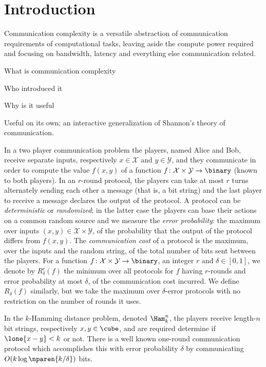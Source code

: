 \chapter{Introduction}
\label{sec:introduction}

Communication complexity is a versatile abstraction of communication requirements of computational tasks, leaving aside the compute power required and focusing on bandwidth, latency and everything else communication related.


What is communication complexity

Who introduced it

Why is it useful

Useful on its own; an interactive generalization of Shannon's theory of communication.



In a two player communication problem the players, 
named Alice and Bob, receive separate inputs, 
respectively $x\in \mathcal{X}$ and $y\in \mathcal{Y}$, 
and they communicate in order to compute the value 
$f(x,y)$ of a function
$f\colon \mathcal{X}\times \mathcal{Y}\to\binary$ 
(known to both players). 
In an $r$-round protocol, the players can take at most 
$r$ turns alternately sending each other a message 
(that is, a bit string) and the last player to receive 
a message declares the output of the protocol.
A protocol can be {\em deterministic} or {\em randomized}; 
in the latter case the players can base their actions on 
a common random source and we measure the 
{\em error probability}: the maximum over inputs 
$(x,y)\in \mathcal{X}\times\mathcal{Y}$, of the probability 
that the output of the protocol differs from $f(x,y)$. 
The {\em communication cost} of a protocol is the maximum, 
over the inputs and the random string, of the total number 
of bits sent between the players.
For a function 
$f\colon \mathcal{X}\times\mathcal{Y}\to\binary$, 
an integer $r$ and $\delta\in[0,1]$, we denote by 
$R^r_{\delta}(f)$ the minimum over all protocols
for $f$ having $r$-rounds and error probability at most 
$\delta$, of the communication cost incurred. We define 
$R_{\delta}(f)$ similarly, but we take the maximum over 
$\delta$-error protocols with no restriction on the number 
of rounds it uses.

In the $k$-Hamming distance problem, denoted $\Ham^n_k$,
the players receive length-$n$ bit strings, respectively 
$x,y\in\cube$, and are required determine if 
$\lone{x-y}< k$ or not.
There is a well known one-round communication protocol
which accomplishes this with error probability $\delta$ 
by communicating $O(k\log\nparen{k/\delta})$ bits.

